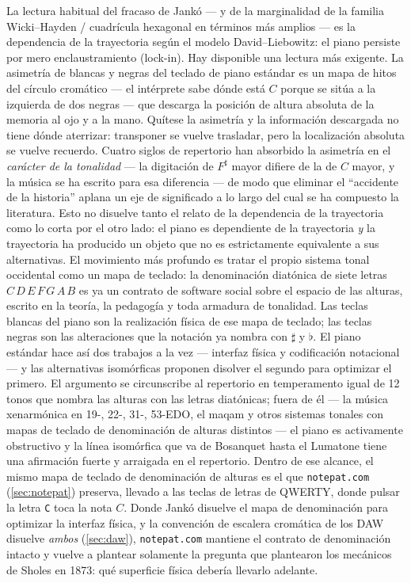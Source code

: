 \documentclass[10pt,letterpaper,twocolumn]{article}
\begin{document}
La lectura habitual del fracaso de Jankó --- y de la marginalidad de la familia Wicki--Hayden / cuadrícula hexagonal en términos más amplios --- es la dependencia de la trayectoria según el modelo David--Liebowitz: el piano persiste por mero enclaustramiento (lock-in). Hay disponible una lectura más exigente. La asimetría de blancas y negras del teclado de piano estándar es un mapa de hitos del círculo cromático --- el intérprete sabe dónde está $C$ porque se sitúa a la izquierda de dos negras --- que descarga la posición de altura absoluta de la memoria al ojo y a la mano. Quítese la asimetría y la información descargada no tiene dónde aterrizar: transponer se vuelve trasladar, pero la localización absoluta se vuelve recuerdo. Cuatro siglos de repertorio han absorbido la asimetría en el \emph{carácter de la tonalidad} --- la digitación de $F^\sharp$ mayor difiere de la de $C$ mayor, y la música se ha escrito para esa diferencia --- de modo que eliminar el ``accidente de la historia'' aplana un eje de significado a lo largo del cual se ha compuesto la literatura. Esto no disuelve tanto el relato de la dependencia de la trayectoria como lo corta por el otro lado: el piano es dependiente de la trayectoria \emph{y} la trayectoria ha producido un objeto que no es estrictamente equivalente a sus alternativas. El movimiento más profundo es tratar el propio sistema tonal occidental como un mapa de teclado: la denominación diatónica de siete letras $C\,D\,E\,F\,G\,A\,B$ es ya un contrato de software social sobre el espacio de las alturas, escrito en la teoría, la pedagogía y toda armadura de tonalidad. Las teclas blancas del piano son la realización física de ese mapa de teclado; las teclas negras son las alteraciones que la notación ya nombra con $\sharp$ y $\flat$. El piano estándar hace así dos trabajos a la vez --- interfaz física y codificación notacional --- y las alternativas isomórficas proponen disolver el segundo para optimizar el primero. El argumento se circunscribe al repertorio en temperamento igual de 12 tonos que nombra las alturas con las letras diatónicas; fuera de él --- la música xenarmónica en 19-, 22-, 31-, 53-EDO, el maqam y otros sistemas tonales con mapas de teclado de denominación de alturas distintos --- el piano es activamente obstructivo y la línea isomórfica que va de Bosanquet hasta el Lumatone tiene una afirmación fuerte y arraigada en el repertorio. Dentro de ese alcance, el mismo mapa de teclado de denominación de alturas es el que \texttt{notepat.com} (\textsection\ref{sec:notepat}) preserva, llevado a las teclas de letras de QWERTY, donde pulsar la letra \texttt{C} toca la nota $C$. Donde Jankó disuelve el mapa de denominación para optimizar la interfaz física, y la convención de escalera cromática de los DAW disuelve \emph{ambos} (\textsection\ref{sec:daw}), \texttt{notepat.com} mantiene el contrato de denominación intacto y vuelve a plantear solamente la pregunta que plantearon los mecánicos de Sholes en 1873: qué superficie física debería llevarlo adelante.
\end{document}
